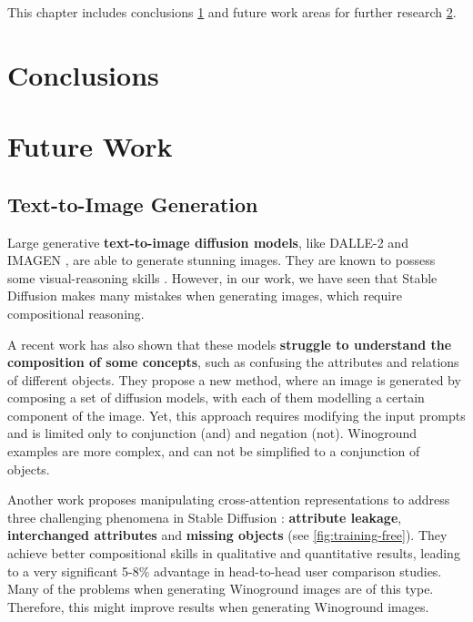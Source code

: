 This chapter includes conclusions \cref{sec:conclusions} and future work areas for further research \cref{sec:future_work}.

\section{Conclusions} \label{sec:conclusions}

\section{Future Work} \label{sec:future_work}

\subsection{Text-to-Image Generation}

Large generative \textbf{text-to-image diffusion models}, like DALLE-2 \cite{ramesh2022hierarchical} and IMAGEN \cite{saharia2022photorealistic}, are able to generate stunning images. They are known to possess some visual-reasoning skills \cite{cho2022dall}. However, in our work, we have seen that Stable Diffusion makes many mistakes when generating images, which require compositional reasoning.

A recent work \cite{liu2022compositional} has also shown that these models \textbf{struggle to understand the composition of some concepts}, such as confusing the attributes and relations of different objects. They propose a new method, where an image is generated by composing a set of diffusion models, with each of them modelling a certain component of the image. Yet, this approach requires modifying the input prompts and is limited only to conjunction (and) and negation (not). Winoground examples are more complex, and can not be simplified to a conjunction of objects.

Another work \cite{anonymous2023trainingfree} proposes manipulating cross-attention representations to address three challenging phenomena in Stable Diffusion \cite{rombach2021highresolution}: \textbf{attribute leakage}, \textbf{interchanged attributes} and \textbf{missing objects} (see \cref{fig:training-free}). They achieve better compositional skills in qualitative and quantitative results, leading to a very significant 5-8\% advantage in head-to-head user comparison studies. Many of the problems when generating Winoground images are of this type. Therefore, this might improve results when generating Winoground images.


